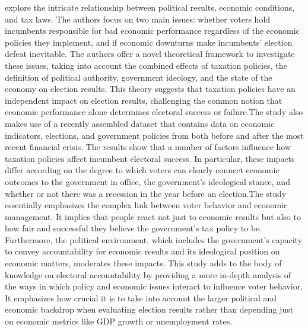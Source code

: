  explore the intricate relationship between political results, economic conditions, and tax laws. The authors focus on two main issues: whether voters hold incumbents responsible for bad economic performance regardless of the economic policies they implement, and if economic downturns make incumbents' election defeat inevitable. The authors offer a novel theoretical framework to investigate these issues, taking into account the combined effects of taxation policies, the definition of political authority, government ideology, and the state of the economy on election results. This theory suggests that taxation policies have an independent impact on election results, challenging the common notion that economic performance alone determines electoral success or failure.The study also makes use of a recently assembled dataset that contains data on economic indicators, elections, and government policies from both before and after the most recent financial crisis. The results show that a number of factors influence how taxation policies affect incumbent electoral success. In particular, these impacts differ according on the degree to which voters can clearly connect economic outcomes to the government in office, the government's ideological stance, and whether or not there was a recession in the year before an election.The study essentially emphasizes the complex link between voter behavior and economic management. It implies that people react not just to economic results but also to how fair and successful they believe the government's tax policy to be. Furthermore, the political environment, which includes the government's capacity to convey accountability for economic results and its ideological position on economic matters, moderates these impacts. This study adds to the body of knowledge on electoral accountability by providing a more in-depth analysis of the ways in which policy and economic issues interact to influence voter behavior. It emphasizes how crucial it is to take into account the larger political and economic backdrop when evaluating election results rather than depending just on economic metrics like GDP growth or unemployment rates.\\
